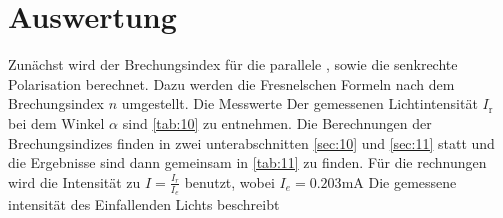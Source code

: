 \section{Auswertung}
\label{sec:Auswertung}

Zunächst wird der Brechungsindex für die parallele , sowie die senkrechte
Polarisation berechnet. Dazu werden die Fresnelschen Formeln nach dem 
Brechungsindex $n$ umgestellt. Die Messwerte Der gemessenen Lichtintensität $I_\text{r}$
bei dem Winkel $\alpha$ sind \autoref{tab:10}  zu entnehmen. Die Berechnungen der Brechungsindizes 
finden in zwei unterabschnitten \autoref{sec:10} und \autoref{sec:11} statt und die Ergebnisse sind 
dann gemeinsam in \autoref{tab:11} zu finden. Für die rechnungen wird die Intensität zu $I = \frac{I_r}{I_e}$ 
benutzt, wobei $I_e = 0.203\unit{\milli\ampere}$  Die gemessene intensität des Einfallenden Lichts beschreibt

